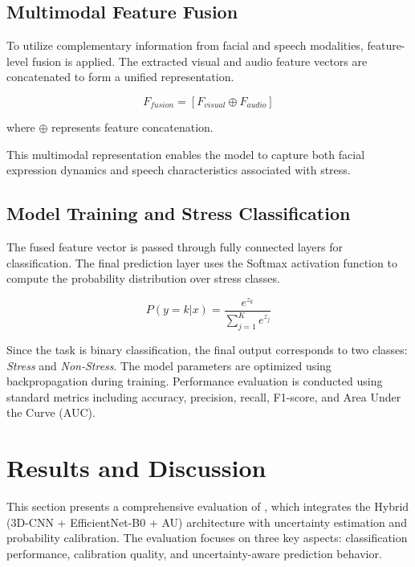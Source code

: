 \documentclass[conference]{IEEEtran}
\begin{document}
\subsection{Multimodal Feature Fusion}

To utilize complementary information from facial and speech modalities, feature-level fusion is applied. The extracted visual and audio feature vectors are concatenated to form a unified representation.

\begin{equation}
F_{fusion} = [F_{visual} \oplus F_{audio}]
\end{equation}

where $\oplus$ represents feature concatenation.

This multimodal representation enables the model to capture both facial expression dynamics and speech characteristics associated with stress.

\subsection{Model Training and Stress Classification}

The fused feature vector is passed through fully connected layers for classification. The final prediction layer uses the Softmax activation function to compute the probability distribution over stress classes.

\begin{equation}
P(y=k|x) = \frac{e^{z_k}}{\sum_{j=1}^{K} e^{z_j}}
\end{equation}

Since the task is binary classification, the final output corresponds to two classes: \textit{Stress} and \textit{Non-Stress}.
The model parameters are optimized using backpropagation during training. Performance evaluation is conducted using standard metrics including accuracy, precision, recall, F1-score, and Area Under the Curve (AUC).

\section{Results and Discussion}
This section presents a comprehensive evaluation of , which integrates the Hybrid (3D-CNN + EfficientNet-B0 + AU) architecture with uncertainty estimation and probability calibration. The evaluation focuses on three key aspects: classification performance, calibration quality, and uncertainty-aware prediction behavior.
\end{document}
